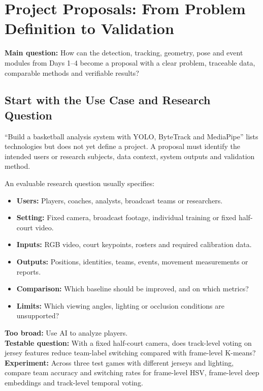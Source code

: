 \documentclass[11pt,a4paper,oneside]{report}
\begin{document}
\chapter{Project Proposals: From Problem Definition to Validation}

\begin{heroBox}
\textbf{Main question:}\quad
How can the detection, tracking, geometry, pose and event modules from Days 1--4 become a proposal with a clear problem, traceable data, comparable methods and verifiable results?
\end{heroBox}

\section{Start with the Use Case and Research Question}

\begin{conceptBox}
``Build a basketball analysis system with YOLO, ByteTrack and MediaPipe'' lists technologies but does not yet define a project. A proposal must identify the intended users or research subjects, data context, system outputs and validation method.
\end{conceptBox}

An evaluable research question usually specifies:

\begin{itemize}
  \item \textbf{Users:} Players, coaches, analysts, broadcast teams or researchers.
  \item \textbf{Setting:} Fixed camera, broadcast footage, individual training or fixed half-court video.
  \item \textbf{Inputs:} RGB video, court keypoints, rosters and required calibration data.
  \item \textbf{Outputs:} Positions, identities, teams, events, movement measurements or reports.
  \item \textbf{Comparison:} Which baseline should be improved, and on which metrics?
  \item \textbf{Limits:} Which viewing angles, lighting or occlusion conditions are unsupported?
\end{itemize}

\begin{plainBox}
\textbf{Too broad:} Use AI to analyze players.\\
\textbf{Testable question:} With a fixed half-court camera, does track-level voting on jersey features reduce team-label switching compared with frame-level K-means?\\
\textbf{Experiment:} Across three test games with different jerseys and lighting, compare team accuracy and switching rates for frame-level HSV, frame-level deep embeddings and track-level temporal voting.
\end{plainBox}
\end{document}
